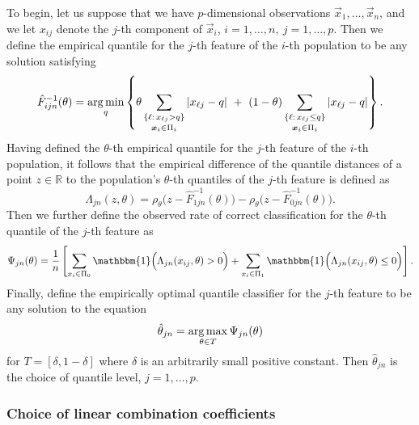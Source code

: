 To begin, let us suppose that we have $p$-dimensional observations
$\vec{x}_1, \dots, \vec{x}_n$, and we let $x_{ij}$ denote the $j$-th component
of $\vec{x}_i$, $i = 1, \dots, n,~ j = 1, \dots, p$.  Then we define the
empirical quantile for the $j$-th feature of the $i$-th population to be any
solution satisfying
\begin{equation}
  \label{eq:multivariate-empirical-quantile}
  \hat{F}_{ijn}^{-1} (\theta) = \operatorname*{arg\,min}_q \left\{
    \theta \sum_{\substack{ \{ \ell:\, x_{\ell j} > q \} \\[0.5mm] \bm{x}_i \in \Pi_i }}
    |x_{\ell j} - q| ~+~
    (1 - \theta)
    \sum_{\substack{ \{ \ell:\, x_{\ell j} \leq q \} \\[0.5mm] \bm{x}_i \in \Pi_i }}
    |x_{\ell j} - q|
  \right\}.
\end{equation}
Having defined the $\theta$-th empirical quantile for the $j$-th feature of the
$i$-th population, it follows that the empirical difference of the quantile
distances of a point $z \in \mathbb{R}$ to the population's $\theta$-th
quantiles of the $j$-th feature is defined as
\[
  \Lambda_{jn} (z, \theta) =
  \rho_{\theta}\Big(z - \hat{F}_{1jn}^{-1}(\theta)\Big) -
  \rho_{\theta}\Big(z - \hat{F}_{0jn}^{-1}(\theta)\Big).
\]
Then we further define the observed rate of correct classification for the
$\theta$-th quantile of the $j$-th feature as
\begin{equation}
  \Psi_{jn}(\theta) = \frac{1}{n}
  \left[
    \sum_{x_i \in \Pi_0}
    \mathbbm{1}\Big( \Lambda_{jn}(x_{ij}, \theta) > 0 \Big) +
    \sum_{x_i \in \Pi_1}
    \mathbbm{1}\Big( \Lambda_{jn}(x_{ij}, \theta) \leq 0 \Big)
  \right].
\end{equation}
Finally, define the empirically optimal quantile classifier for the $j$-th
feature to be any solution to the equation
\begin{equation}
  \hat{\theta}_{jn} = \operatorname*{arg\,max}_{\theta \in T} \Psi_{jn}(\theta)
\end{equation}
for $T = [ \delta, 1 - \delta]$ where $\delta$ is an arbitrarily small positive
constant.  Then $\hat{\theta}_{jn}$ is the choice of quantile level,
$j = 1, \dots, p$.




\subsubsection{Choice of linear combination coefficients}
\label{sec:variable-coefficients}

